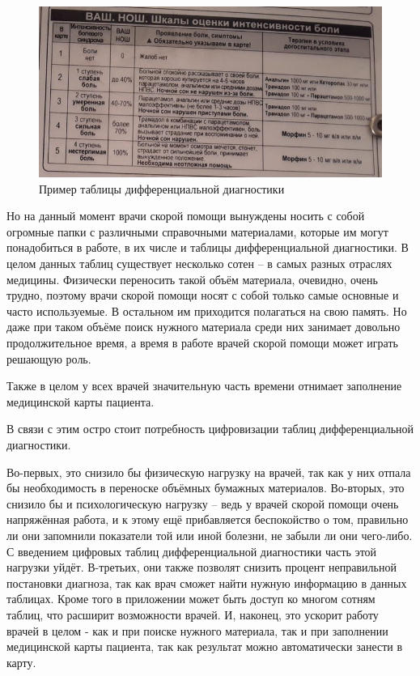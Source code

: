 \begin{figure}
  \includegraphics[scale=0.6]{src/ВАШ. НОШ. Шкалы оценки интенсивности боли.jpg}
  \caption{Пример таблицы дифференциальной диагностики}
  \label{fig:tab1}
\end{figure}

Но на данный момент врачи скорой помощи вынуждены носить с собой огромные папки с различными справочными материалами, которые им могут понадобиться в работе, в их числе и таблицы дифференциальной диагностики. В целом данных таблиц существует несколько сотен -- в самых разных отраслях медицины. Физически переносить такой объём материала, очевидно, очень трудно, поэтому врачи скорой помощи носят с собой только самые основные и часто используемые. В остальном им приходится полагаться на свою память. Но даже при таком объёме поиск нужного материала среди них занимает довольно продолжительное время, а время в работе врачей скорой помощи может играть решающую роль. 

Также в целом у всех врачей значительную часть времени отнимает заполнение медицинской карты пациента.

В связи с этим остро стоит потребность цифровизации таблиц дифференциальной диагностики.

Во-первых, это снизило бы физическую нагрузку на врачей, так как у них отпала бы необходимость в переноске объёмных бумажных материалов. Во-вторых, это снизило бы и психологическую нагрузку -- ведь у врачей скорой помощи очень напряжённая работа, и к этому ещё прибавляется беспокойство о том, правильно ли они запомнили показатели той или иной болезни, не забыли ли они чего-либо. С введением цифровых таблиц дифференциальной диагностики  часть этой нагрузки уйдёт. В-третьих, они также позволят снизить процент неправильной постановки диагноза, так как врач сможет найти нужную информацию в данных таблицах. Кроме того в приложении может быть доступ ко многом сотням таблиц, что расширит возможности врачей. И, наконец, это ускорит работу врачей в целом - как и при поиске нужного материала, так и при заполнении медицинской карты пациента, так как результат можно автоматически занести в карту.

